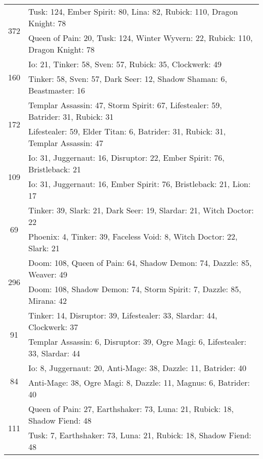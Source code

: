 \documentclass[result.tex]{subfiles}
\begin{document}
\begin{table}[H]
\begin{tabular}{ | c | p{12.5cm} | }
    \hline
    \multirow{2}{*}{372}
    & Tusk: 124, Ember Spirit: 80, Lina: 82, Rubick: 110, Dragon Knight: 78 \\
    & Queen of Pain: 20, Tusk: 124, Winter Wyvern: 22, Rubick: 110, Dragon Knight: 78 \\
    \hline
    \multirow{2}{*}{160}
    & Io: 21, Tinker: 58, Sven: 57, Rubick: 35, Clockwerk: 49 \\
    & Tinker: 58, Sven: 57, Dark Seer: 12, Shadow Shaman: 6, Beastmaster: 16 \\
    \hline
    \multirow{2}{*}{172}
    & Templar Assassin: 47, Storm Spirit: 67, Lifestealer: 59, Batrider: 31, Rubick: 31 \\
    & Lifestealer: 59, Elder Titan: 6, Batrider: 31, Rubick: 31, Templar Assassin: 47 \\
    \hline
    \multirow{2}{*}{109}
    & Io: 31, Juggernaut: 16, Disruptor: 22, Ember Spirit: 76, Bristleback: 21 \\
    & Io: 31, Juggernaut: 16, Ember Spirit: 76, Bristleback: 21, Lion: 17 \\
    \hline
    \multirow{2}{*}{69}
    & Tinker: 39, Slark: 21, Dark Seer: 19, Slardar: 21, Witch Doctor: 22 \\
    & Phoenix: 4, Tinker: 39, Faceless Void: 8, Witch Doctor: 22, Slark: 21 \\
    \hline
    \multirow{2}{*}{296}
    & Doom: 108, Queen of Pain: 64, Shadow Demon: 74, Dazzle: 85, Weaver: 49 \\
    & Doom: 108, Shadow Demon: 74, Storm Spirit: 7, Dazzle: 85, Mirana: 42 \\
    \hline
    \multirow{2}{*}{91}
    & Tinker: 14, Disruptor: 39, Lifestealer: 33, Slardar: 44, Clockwerk: 37 \\
    & Templar Assassin: 6, Disruptor: 39, Ogre Magi: 6, Lifestealer: 33, Slardar: 44 \\
    \hline
    \multirow{2}{*}{84}
    & Io: 8, Juggernaut: 20, Anti-Mage: 38, Dazzle: 11, Batrider: 40 \\
    & Anti-Mage: 38, Ogre Magi: 8, Dazzle: 11, Magnus: 6, Batrider: 40 \\
    \hline
    \multirow{2}{*}{111}
    & Queen of Pain: 27, Earthshaker: 73, Luna: 21, Rubick: 18, Shadow Fiend: 48 \\
    & Tusk: 7, Earthshaker: 73, Luna: 21, Rubick: 18, Shadow Fiend: 48 \\
    \hline
  \end{tabular}
  \caption{}
  \label{}
\end{table}
\end{document}
